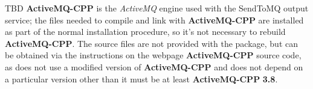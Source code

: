 \tertiaryEnd
{}
TBD
\tertiaryEnd
\secondaryEnd
{}
\textbf{ActiveMQ-CPP} is the \emph{ActiveMQ} engine used with the SendToMQ output service;
the files needed to compile and link with \textbf{ActiveMQ-CPP} are installed as part of
the normal \mplusm{} installation procedure, so it's not necessary to rebuild
\textbf{ActiveMQ-CPP}.
The source files are not provided with the  package, but can be obtained
via the instructions on the web\longDash{}page
%
{\textbf{ActiveMQ-CPP} source code}, as \mplusm{} does not use a modified version of
\textbf{ActiveMQ-CPP} and does not depend on a particular version \longDash{} other than
it must be at least \textbf{ActiveMQ-CPP} \textbf{3.8}.\\

